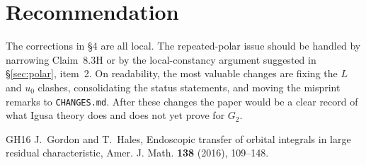 \documentclass[12pt,letterpaper]{amsart}
\begin{document}
\section{Recommendation}

The corrections in \S4 are all local. The repeated-polar issue should be
handled by narrowing Claim~8.3H or by the local-constancy argument suggested
in \S\ref{sec:polar}, item~2. On readability, the most valuable changes are
fixing the $L$ and $u_0$ clashes, consolidating the status statements, and
moving the misprint remarks to \texttt{CHANGES.md}. After these changes the
paper would be a clear record of what Igusa theory does and does not yet
prove for $G_2$.

\begin{thebibliography}{GH16}
 J.~Gordon and T.~Hales, Endoscopic transfer of orbital
integrals in large residual characteristic, Amer. J. Math. \textbf{138}
(2016), 109--148.
\end{thebibliography}
\end{document}
